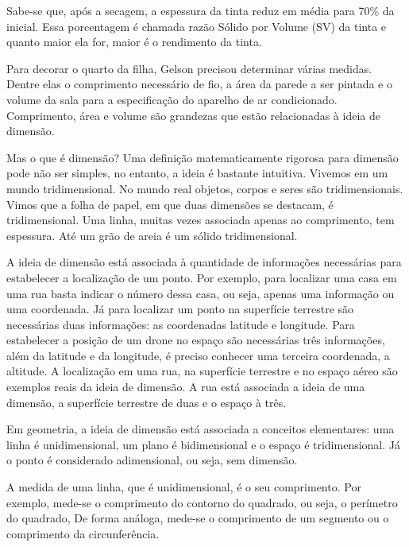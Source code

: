 \begin{observation}{}

Sabe-se que, após a secagem, a espessura da tinta reduz em média para 70\% da inicial. Essa porcentagem é chamada razão Sólido por Volume (SV) da tinta e quanto maior ela for, maior é o rendimento da tinta.
\end{observation}


\label{\detokenize{GE504-3:organizando-as-ideias-dimensao}}\label{\detokenize{GE504-3::doc}}
Para decorar o quarto da filha, Gelson precisou determinar várias medidas. Dentre elas o comprimento necessário de fio, a área da parede a ser pintada e o volume da sala para a especificação do aparelho de ar condicionado. Comprimento, área e volume são grandezas que estão relacionadas à ideia de dimensão.

Mas o que é dimensão? Uma definição matematicamente rigorosa para dimensão pode não ser simples, no entanto, a ideia é bastante intuitiva. Vivemos em um mundo tridimensional. No mundo real objetos, corpos e seres são tridimensionais. Vimos que a folha de papel, em que duas dimensões se destacam, é tridimensional. Uma linha, muitas vezes associada apenas ao comprimento, tem espessura. Até um grão de areia é um sólido tridimensional.

A ideia de dimensão está associada à quantidade de informações necessárias para estabelecer a localização de um ponto. Por exemplo, para localizar uma casa em uma rua basta indicar o número dessa casa, ou seja, apenas uma informação ou uma coordenada. Já para localizar um ponto na superfície terrestre são necessárias duas informações: as coordenadas latitude e longitude. Para estabelecer a posição de um drone no espaço são necessárias três informações, além da latitude e da longitude, é preciso conhecer uma terceira coordenada, a altitude. A localização em uma rua, na superfície terrestre e no espaço aéreo são exemplos reais da ideia de dimensão. A rua está associada a ideia de uma dimensão, a superfície terrestre de duas e o espaço à três.

Em geometria, a ideia de dimensão está associada a conceitos elementares: uma linha é unidimensional, um plano é bidimensional e o espaço é tridimensional. Já o ponto é considerado adimensional, ou seja, sem dimensão.

A medida de uma linha, que é unidimensional, é o seu comprimento. Por exemplo, mede-se o comprimento do contorno do quadrado, ou seja, o perímetro do quadrado, De forma análoga, mede-se o comprimento de um segmento ou o comprimento da circunferência.

